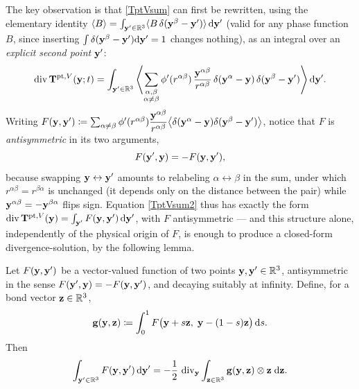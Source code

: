 The key observation is that \eqref{TptVsum} can first be rewritten, using the elementary identity $\langle B\rangle=\int_{\mathbf{y}'\in\mathbb R^3}\langle B\,\delta(\mathbf{y}^\beta-\mathbf{y}')\rangle\,\mathrm{d}\mathbf{y}'$ (valid for any phase function $B$, since inserting $\int\delta(\mathbf{y}^\beta-\mathbf{y}')\mathrm{d}\mathbf{y}'=1$ changes nothing), as an integral over an \textit{explicit second point} $\mathbf{y}'$:
\begin{equation}\label{TptVsum2}
	\operatorname{div}\mathbf{T}^{{\rm pt},V}(\mathbf{y};t) = \int_{\mathbf{y}'\in\mathbb R^3}\left\langle \sum_{\substack{\alpha,\beta\\\alpha\neq\beta}} \phi'(r^{\alpha\beta})\,\frac{\mathbf{y}^{\alpha\beta}}{r^{\alpha\beta}}\,\delta(\mathbf{y}^\alpha-\mathbf{y})\,\delta(\mathbf{y}^\beta-\mathbf{y}')\right\rangle \mathrm{d}\mathbf{y}'.
\end{equation}
Writing $F(\mathbf{y},\mathbf{y}')\coloneqq \sum_{\alpha\neq\beta}\phi'(r^{\alpha\beta})\dfrac{\mathbf{y}^{\alpha\beta}}{r^{\alpha\beta}}\big\langle\delta(\mathbf{y}^\alpha-\mathbf{y})\delta(\mathbf{y}^\beta-\mathbf{y}')\big\rangle$, notice that $F$ is \textit{antisymmetric} in its two arguments,
\begin{equation}\label{Fantisym}
	F(\mathbf{y}',\mathbf{y}) = -F(\mathbf{y},\mathbf{y}'),
\end{equation}
because swapping $\mathbf{y}\leftrightarrow\mathbf{y}'$ amounts to relabeling $\alpha\leftrightarrow\beta$ in the sum, under which $r^{\alpha\beta}=r^{\beta\alpha}$ is unchanged (it depends only on the distance between the pair) while $\mathbf{y}^{\alpha\beta}=-\mathbf{y}^{\beta\alpha}$ flips sign. Equation \eqref{TptVsum2} thus has exactly the form $\operatorname{div}\mathbf{T}^{{\rm pt},V}(\mathbf{y})=\int_{\mathbf{y}'}F(\mathbf{y},\mathbf{y}')\,\mathrm{d}\mathbf{y}'$, with $F$ antisymmetric --- and this structure alone, independently of the physical origin of $F$, is enough to produce a closed-form divergence-solution, by the following lemma.

\begin{theorem}\label{thm:noll}
	Let $F(\mathbf{y},\mathbf{y}')$ be a vector-valued function of two points $\mathbf{y},\mathbf{y}'\in\mathbb R^3$, antisymmetric in the sense $F(\mathbf{y}',\mathbf{y})=-F(\mathbf{y},\mathbf{y}')$, and decaying suitably at infinity. Define, for a bond vector $\mathbf{z}\in\mathbb R^3$,
	\begin{equation}\label{noll_g}
		\mathbf{g}(\mathbf{y},\mathbf{z}) \coloneqq \int_0^1 F\big(\mathbf{y}+s\mathbf{z},\;\mathbf{y}-(1-s)\mathbf{z}\big)\,\mathrm{d} s.
	\end{equation}
	Then
	\begin{equation}\label{noll_lemma}
		\int_{\mathbf{y}'\in\mathbb R^3} F(\mathbf{y},\mathbf{y}')\,\mathrm{d}\mathbf{y}' = -\frac12\,\operatorname{div}_{\mathbf{y}}\int_{\mathbf{z}\in\mathbb R^3} \mathbf{g}(\mathbf{y},\mathbf{z})\otimes\mathbf{z} \;\mathrm{d}\mathbf{z}.
	\end{equation}
\end{theorem}

